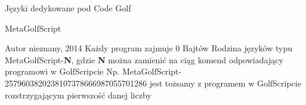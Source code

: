 \begin{frame}{Języki dedykowane pod Code Golf}

    {\large MetaGolfScript}

    \begin{itemize}
        \myitem Autor nieznany, 2014
        \myitem Każdy program zajmuje 0 Bajtów
        \myitem Rodzina języków typu MetaGolfScript-\textbf{N}, gdzie \textbf{N} można zamienić na ciąg komend odpowiadający programowi w GolfScripcie
        \myitem Np. MetaGolfScript-2579603820238107378666987055701286 jest tożsamy z programem w GolfScripcie rozstrzygającym pierwszość danej liczby
    \end{itemize}

\end{frame}
